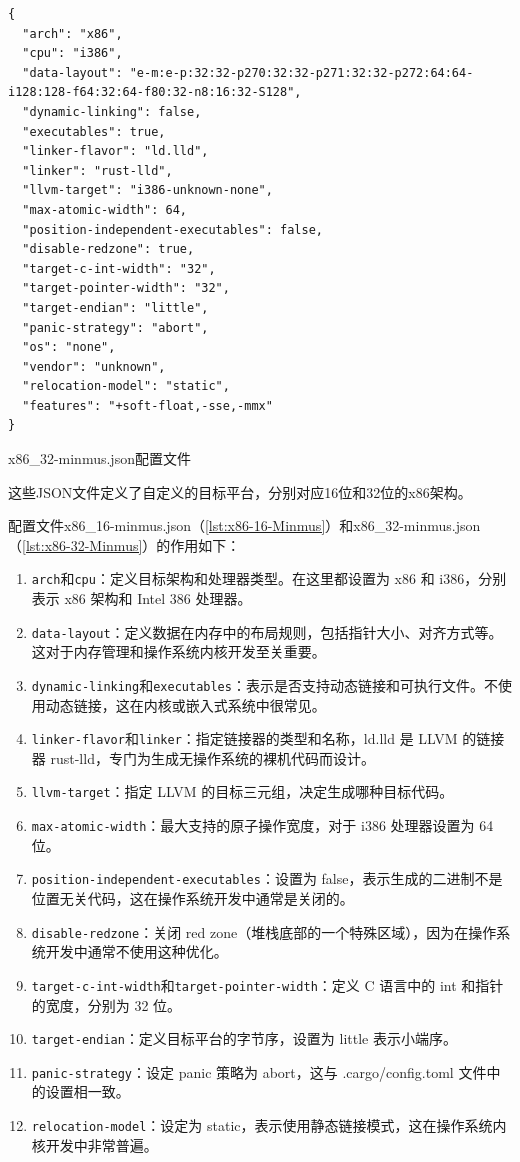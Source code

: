 \begin{listing}[htbp]
    \begin{verbatim}
{
  "arch": "x86",
  "cpu": "i386",
  "data-layout": "e-m:e-p:32:32-p270:32:32-p271:32:32-p272:64:64-i128:128-f64:32:64-f80:32-n8:16:32-S128",
  "dynamic-linking": false,
  "executables": true,
  "linker-flavor": "ld.lld",
  "linker": "rust-lld",
  "llvm-target": "i386-unknown-none",
  "max-atomic-width": 64,
  "position-independent-executables": false,
  "disable-redzone": true,
  "target-c-int-width": "32",
  "target-pointer-width": "32",
  "target-endian": "little",
  "panic-strategy": "abort",
  "os": "none",
  "vendor": "unknown",
  "relocation-model": "static",
  "features": "+soft-float,-sse,-mmx"
}
    \end{verbatim}
    \caption{x86\_32-minmus.json配置文件}\label{lst:x86-32-Minmus}
\end{listing}

这些JSON文件定义了自定义的目标平台，分别对应16位和32位的x86架构。

配置文件x86\_16-minmus.json（\cref{lst:x86-16-Minmus}）和x86\_32-minmus.json（\cref{lst:x86-32-Minmus}）的作用如下：

\begin{enumerate}
    \item \texttt{arch}和\texttt{cpu}：定义目标架构和处理器类型。在这里都设置为 x86 和 i386，分别表示 x86 架构和 Intel 386 处理器。
    \item \texttt{data-layout}：定义数据在内存中的布局规则，包括指针大小、对齐方式等。这对于内存管理和操作系统内核开发至关重要。
    \item \texttt{dynamic-linking}和\texttt{executables}：表示是否支持动态链接和可执行文件。不使用动态链接，这在内核或嵌入式系统中很常见。
    \item \texttt{linker-flavor}和\texttt{linker}：指定链接器的类型和名称，ld.lld 是 LLVM 的链接器 rust-lld，专门为生成无操作系统的裸机代码而设计。
    \item \texttt{llvm-target}：指定 LLVM 的目标三元组，决定生成哪种目标代码。
    \item \texttt{max-atomic-width}：最大支持的原子操作宽度，对于 i386 处理器设置为 64 位。
    \item \texttt{position-independent-executables}：设置为 false，表示生成的二进制不是位置无关代码，这在操作系统开发中通常是关闭的。
    \item \texttt{disable-redzone}：关闭 red zone（堆栈底部的一个特殊区域），因为在操作系统开发中通常不使用这种优化。
    \item \texttt{target-c-int-width}和\texttt{target-pointer-width}：定义 C 语言中的 int 和指针的宽度，分别为 32 位。
    \item \texttt{target-endian}：定义目标平台的字节序，设置为 little 表示小端序。
    \item \texttt{panic-strategy}：设定 panic 策略为 abort，这与 .cargo/config.toml 文件中的设置相一致。
    \item \texttt{relocation-model}：设定为 static，表示使用静态链接模式，这在操作系统内核开发中非常普遍。
\end{enumerate}

